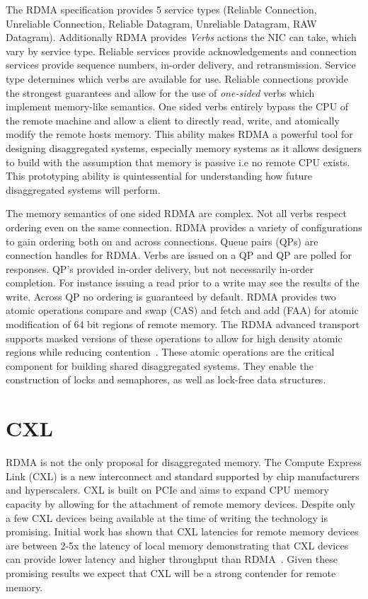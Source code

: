 \documentclass[12pt]{ucsddissertation}
\begin{document}
The RDMA specification provides 5 service types (Reliable Connection, Unreliable Connection,
Reliable Datagram, Unreliable Datagram, RAW Datagram). Additionally RDMA provides \textit{Verbs}
actions the NIC can take, which vary by service type. Reliable services provide acknowledgements and
connection services provide sequence numbers, in-order delivery, and retransmission. Service type
determines which verbs are available for use. Reliable connections provide the strongest guarantees
and allow for the use of \textit{one-sided} verbs which implement memory-like semantics. One sided
verbs entirely bypass the CPU of the remote machine and allow a client to directly read, write, and
atomically modify the remote hosts memory. This ability makes RDMA a powerful tool for designing
disaggregated systems, especially memory systems as it allows designers to build with the assumption
that memory is passive i.e no remote CPU exists. This prototyping ability is quintessential for
understanding how future disaggregated systems will perform.

The memory semantics of one sided RDMA are complex. Not all verbs respect ordering even on the same
connection. RDMA provides a variety of configurations to gain ordering both on and across
connections. Queue pairs (QPs) are connection handles for RDMA. Verbs are issued on a QP and QP are
polled for responses. QP's provided in-order delivery, but not necessarily in-order completion. For
instance issuing a read prior to a write may see the results of the write. Across QP no ordering is
guaranteed by default. RDMA provides two atomic operations compare and swap (CAS) and fetch and add
(FAA) for atomic modification of 64 bit regions of remote memory. The RDMA advanced transport
supports masked versions of these operations to allow for high density atomic regions while reducing
contention~\cite{rdma-masked-cas}. These atomic operations are the critical component for building
shared disaggregated systems. They enable the construction of locks and semaphores, as well as
lock-free data structures.

\section{CXL}

RDMA is not the only proposal for disaggregated memory. The Compute Express Link (CXL) is a new
interconnect and standard supported by chip manufacturers and hyperscalers. CXL is built on PCIe and
aims to expand CPU memory capacity by allowing for the attachment of remote memory devices. Despite
only a few CXL devices being available at the time of writing the technology is promising. Initial
work has shown that CXL latencies for remote memory devices are between 2-5x the latency of local
memory demonstrating that CXL devices can provide lower latency and higher throughput than
RDMA~\cite{cxl-demyst}. Given these promising results we expect that CXL will be a strong contender
for remote memory. 
\end{document}
